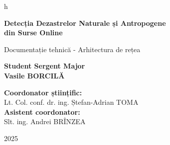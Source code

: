 h\documentclass[12pt,a4paper]{article}
\begin{document}
\begin{titlepage}
    \centering
    
    
    \vspace*{2cm}
    
    {\LARGE\bfseries Detecția Dezastrelor Naturale și Antropogene\\din Surse Online}
    
    \vspace{1.5cm}
    
    {\large Documentație tehnică - Arhitectura de rețea}
    
    \vspace{2cm}
    
    {\large\bfseries Student Sergent Major\\Vasile BORCILĂ}
    
    \vspace{1.5cm}
    
    \begin{flushleft}
        \textbf{Coordonator științific:}\\
        Lt. Col. conf. dr. ing. Ștefan-Adrian TOMA\\[0.5cm]
        
        \textbf{Asistent coordonator:}\\
        Slt. ing. Andrei BRÎNZEA
    \end{flushleft}
    
    \vfill
    
    {\large 2025}
    
    \vspace{1cm}
\end{titlepage}
\end{document}
